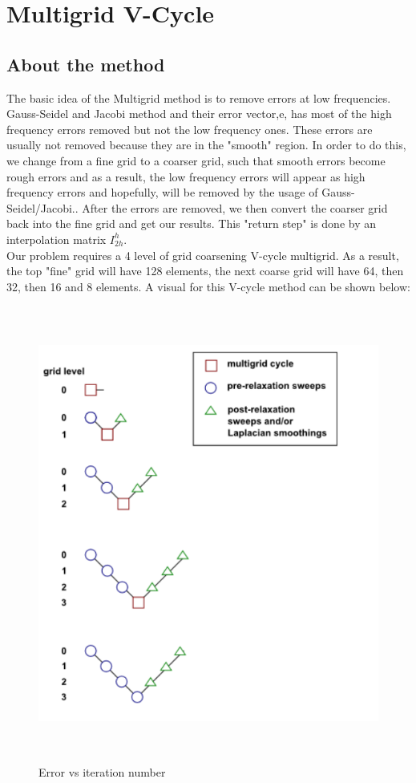 \documentclass{article}
\begin{document}
\section{Multigrid V-Cycle}
\subsection{About the method}
The basic idea of the Multigrid method is to remove errors at low frequencies. Gauss-Seidel and Jacobi method and their error vector,e, has most of the high frequency errors removed but not the low frequency ones. These errors are usually not removed because they are in the "smooth" region. In order to do this, we change from a fine grid to a coarser grid, such that smooth errors become rough errors and as a result, the low frequency errors will appear as high frequency errors and hopefully, will be removed by the usage of Gauss-Seidel/Jacobi.. After the errors are removed, we then convert the coarser grid back into the fine grid and get our results. This "return step" is done by an interpolation matrix $I_{2h}^{h}$. \\

\noindent
Our problem requires a 4 level of grid coarsening V-cycle multigrid. As a result, the top "fine" grid will have 128 elements, the next coarse grid will have 64, then 32, then 16 and 8 elements. A visual for this V-cycle method can be shown below: 

\begin{figure}[H]
	\includegraphics[width=\linewidth,height = 150mm]{multigrid.png}		
	\caption{Error vs iteration number}
\end{figure}
\end{document}
